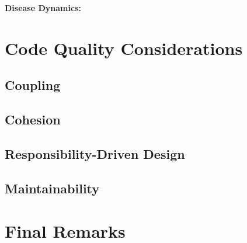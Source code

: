 \documentclass[12pt, a4paper]{scrartcl}
\begin{document}
\begin{multicols}{2}
  \noindent \textbf{Disease Dynamics:} 

\section{Code Quality Considerations}

\subsection{Coupling}


\subsection{Cohesion}


\subsection{Responsibility-Driven Design}


\subsection{Maintainability}


\section{Final Remarks}


\end{multicols}
\end{document}
